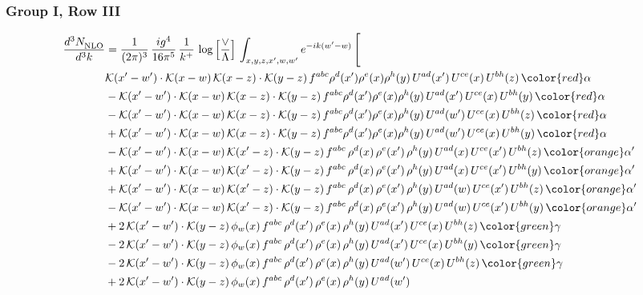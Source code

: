 \subsubsection{Group I, Row III}
\begin{align}
    \frac{d^{3}N_{\rm NLO}^{\rm}}{d^{3}k}  & = \frac{1}{(2\pi)^{3}}\, \frac{ig^{4}}{16\pi^{5}}\, \frac{1}{k^{+}}\, \log{\left[\frac{\vee}{\Lambda}\right]}\, \int_{x,y,z,x^{\prime},w,w^{\prime}}e^{-ik(w^{\prime}-w)}\, \Bigg[\notag \\ & \mathcal{K}(x'-w')\cdot \mathcal{K}(x-w)\, \mathcal{K}(x-z)\cdot \mathcal{K}(y-z)\, f^{abc}\rho^{d}(x')\rho^{e}(x)\rho^{h}(y)\, U^{ad}(x')\,U^{ce}(x)\, U^{bh}(z)\, {\color{red}\alpha}\notag \\ & - \mathcal{K}(x'-w')\cdot \mathcal{K}(x-w)\, \mathcal{K}(x-z)\cdot \mathcal{K}(y-z)\, f^{abc}\rho^{d}(x')\rho^{e}(x)\rho^{h}(y)\, U^{ad}(x')\,U^{ce}(x)\, U^{bh}(y)\, {\color{red}\alpha}\notag \\ & -\mathcal{K}(x'-w')\cdot \mathcal{K}(x-w)\, \mathcal{K}(x-z)\cdot \mathcal{K}(y-z)\, f^{abc}\rho^{d}(x')\rho^{e}(x)\rho^{h}(y)\, U^{ad}(w')\,U^{ce}(x)\, U^{bh}(z)\, {\color{red}\alpha}\notag \\ & +\mathcal{K}(x'-w')\cdot \mathcal{K}(x-w)\, \mathcal{K}(x-z)\cdot \mathcal{K}(y-z)\, f^{abc}\rho^{d}(x')\rho^{e}(x)\rho^{h}(y)\, U^{ad}(w')\,U^{ce}(x)\, U^{bh}(y)\, {\color{red}\alpha}\notag \\ & -\mathcal{K}(x'-w')\cdot \mathcal{K}(x-w)\, \mathcal{K}(x'-z)\cdot \mathcal{K}(y-z)\, f^{abc}\,\rho^{d}(x)\,\rho^{e}(x')\,\rho^{h}(y)\,U^{ad}(x)\,U^{ce}(x')\,U^{bh}(z)\, {\color{orange} \alpha'}\notag \\ & + \mathcal{K}(x'-w')\cdot \mathcal{K}(x-w)\, \mathcal{K}(x'-z)\cdot \mathcal{K}(y-z)\, f^{abc}\,\rho^{d}(x)\,\rho^{e}(x')\,\rho^{h}(y)\,U^{ad}(x)\,U^{ce}(x')\,U^{bh}(y)\, {\color{orange} \alpha'}\notag \\ & + \mathcal{K}(x'-w')\cdot \mathcal{K}(x-w)\, \mathcal{K}(x'-z)\cdot \mathcal{K}(y-z)\, f^{abc}\,\rho^{d}(x)\,\rho^{e}(x')\,\rho^{h}(y)\,U^{ad}(w)\,U^{ce}(x')\,U^{bh}(z)\, {\color{orange} \alpha'}\notag \\ & -\mathcal{K}(x'-w')\cdot \mathcal{K}(x-w)\, \mathcal{K}(x'-z)\cdot \mathcal{K}(y-z)\, f^{abc}\,\rho^{d}(x)\,\rho^{e}(x')\,\rho^{h}(y)\,U^{ad}(w)\,U^{ce}(x')\,U^{bh}(y)\, {\color{orange} \alpha'}\notag \\ & +2\,\mathcal{K}(x'-w')\cdot \mathcal{K}(y-z)\, \mathcal{\phi}_{w}(x)\, f^{abc}\, \rho^{d}(x')\,\rho^{e}(x)\,\rho^{h}(y)\, U^{ad}(x')\, U^{ce}(x)\, U^{bh}(z)\, {\color{green} \gamma}\notag \\ & -2\,\mathcal{K}(x'-w')\cdot \mathcal{K}(y-z)\, \mathcal{\phi}_{w}(x)\, f^{abc}\, \rho^{d}(x')\,\rho^{e}(x)\,\rho^{h}(y)\, U^{ad}(x')\, U^{ce}(x)\, U^{bh}(y)\, {\color{green} \gamma}\notag \\ & -2\,\mathcal{K}(x'-w')\cdot \mathcal{K}(y-z)\, \mathcal{\phi}_{w}(x)\, f^{abc}\, \rho^{d}(x')\,\rho^{e}(x)\,\rho^{h}(y)\, U^{ad}(w')\, U^{ce}(x)\, U^{bh}(z)\, {\color{green} \gamma}\notag \\ &  + 2\,\mathcal{K}(x'-w')\cdot \mathcal{K}(y-z)\, \mathcal{\phi}_{w}(x)\, f^{abc}\, \rho^{d}(x')\,\rho^{e}(x)\,\rho^{h}(y)\, U^{ad}(w')\, 
\end{align}
